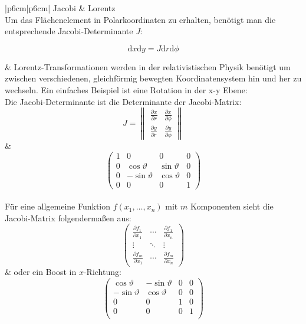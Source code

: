 \documentclass[a4paper, 10pt,onecolumn]{scrartcl}
\begin{document}
\begin{center}
	\begin{tabular}{|p{6cm}|p{6cm}|}
		\hline
		Jacobi & Lorentz \\
		\hline \hline
		Um das Flächenelement in Polarkoordinaten zu erhalten, benötigt man die entsprechende Jacobi-Determinante \textit{J}: 
		\begin{center}
		\[
		\mathrm{d}x\mathrm{d}y=J \mathrm{d}r\mathrm{d}\phi
		\]
		\end{center}
		& 
		Lorentz-Transformationen werden in der relativistischen Physik benötigt um zwischen verschiedenen, gleichförmig bewegten Koordinatensystem hin und her zu wechseln. Ein einfaches Beispiel ist eine Rotation in der x-y Ebene:\\
		Die Jacobi-Determinante ist die Determinante der Jacobi-Matrix:
		\[
		J= 
		\begin{Vmatrix}
		\frac{\partial x}{\partial r} & \frac{\partial x}{\partial \phi}\\
		\frac{\partial y}{\partial r} & \frac{\partial y}{\partial \phi}
		\end{Vmatrix}
		\]
		& 
		\[
		\begin{pmatrix}
			1 & 0 & 0 & 0 \\
			0 & \cos \vartheta & \sin \vartheta & 0 \\
			0 & -\sin\vartheta & \cos \vartheta & 0 \\
			0 & 0 & 0 & 1
		\end{pmatrix}
		\] \\
		Für eine allgemeine Funktion $f(x_1, \dots, x_n)$ mit $m$ Komponenten sieht die Jacobi-Matrix folgendermaßen aus:
		\[
		\begin{pmatrix}
		\frac{\partial f_1}{\partial x_1} & \cdots & \frac{\partial f_1}{\partial x_n} \\
		\vdots & \ddots & \vdots \\
		\frac{\partial f_m}{\partial x_1} & \cdots & \frac{\partial f_m}{\partial x_n}
		\end{pmatrix}
		\] 
		& oder ein Boost in $x$-Richtung:
		\[
		\begin{pmatrix}
			\cos \vartheta & -\sin \vartheta & 0 & 0 \\
			-\sin \vartheta & \cos \vartheta & 0 & 0 \\
			0 & 0 & 1 & 0 \\
			0 & 0 & 0 & 1 \\
		\end{pmatrix}
		\] \\
		\hline
	\end{tabular}
\end{center}
\end{document}
